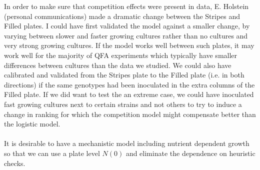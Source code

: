 In order to make sure that competition effects were present in data,
E. Holstein (personal communications) made a dramatic change between
the Stripes and Filled plates. I could have first validated the model
against a smaller change, by varying between slower and faster growing
cultures rather than no cultures and very strong growing cultures. If
the model works well between such plates, it may work well for the
majority of QFA experiments which typically have smaller differences
between cultures than the data we studied. We could also have
calibrated and validated from the Stripes plate to the Filled plate
(i.e. in both directions) if the same genotypes had been inoculated in
the extra columns of the Filled plate. If we did want to test the an
extreme case, we could have inoculated fast growing cultures next to
certain strains and not others to try to induce a change in ranking
for which the competition model might compensate better than the
logistic model.
\\\\
It is desirable to have a mechanistic model including nutrient
dependent growth so that we can use a plate level \(N(0)\) and
eliminate the dependence on heuristic checks.



